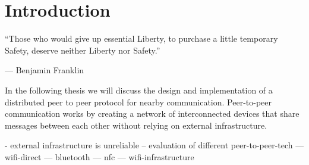 \chapter{Introduction}

\epigraph{``Those who would give up essential Liberty, to purchase a little temporary Safety, deserve neither Liberty nor Safety.''}{--- \textup{Benjamin Franklin} }

In the following thesis we will discuss the design and implementation of a distributed peer to peer protocol for nearby communication.
Peer-to-peer communication works by creating a network of interconnected devices that share messages between each other without relying on external infrastructure.

- external infrastructure is unreliable
-- evaluation of different peer-to-peer-tech
--- wifi-direct
--- bluetooth
--- nfc
--- wifi-infrastructure